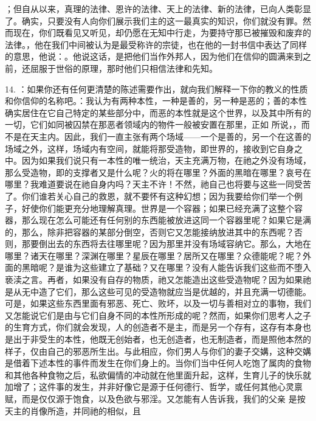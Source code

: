 ；但自从以来，真理的法律、恩许的法律、天上的法律、新的法律，已向人类彰显了。确实，只要没有人向你们展示我们主的这一最真实的知识，你们就没有罪。然而现在，你们既看见又听见，却仍愿在无知中行走，为要持守那已被摧毁和废弃的法律。，他在我们中间被认为是最受称许的宗徒，也在他的一封书信中表达了同样的意思，他说：。他说这话，是把他们当作外邦人，因为他们在信仰的圆满来到之前，还屈服于世俗的原理，那时他们只相信法律和先知。\par

14. ：如果你还有任何更清楚的陈述需要作出，就向我们解释一下你的教义的性质和你信仰的名称吧。：我认为有两种本性，一种是善的，另一种是恶的；善的本性确实居住在它自己特定的某些部分中，而恶的本性就是这个世界，以及其中所有的一切，它们如同被囚禁在那恶者领域内的物件一般被安置在那里，正如  所说，，而不是在天主内。因此，我们一直主张有两个场域——一个是善的，另一个在这善的场域之外，这样，场域内有空间，就能将那受造物，即世界的，接收到它自身之中。因为如果我们说只有一本性的唯一统治，天主充满万物，在祂之外没有场域，那么受造物，即的支撑者又是什么呢？火的将在哪里？外面的黑暗在哪里？哀号在哪里？我难道要说在祂自身内吗？天主不许！不然，祂自己也将要与这些一同受苦了。你们谁若关心自己的救恩，就不要怀有这种幻想；因为我要给你们举一个例子，好使你们能更充分地理解真理。世界是一个容器；如果已经充满了这整个容器，那么现在怎么可能还有任何别的东西能被放进这同一个容器里呢？如果它是满的，那么，除非把容器的某部分倒空，否则它又怎能接纳放进其中的东西呢？否则，那要倒出去的东西将去往哪里呢？因为那里并没有场域容纳它。那么，大地在哪里？诸天在哪里？深渊在哪里？星辰在哪里？居所又在哪里？众德能呢？呢？外面的黑暗呢？是谁为这些建立了基础？又在哪里？没有人能告诉我们这些而不堕入亵渎之言。再者，如果没有自存的物质，祂又怎能造出这些受造物呢？因为如果祂是从无中造了它们，那么这些可见的受造物就应当是优越的，并且充满一切德能。可是，如果这些东西里面有邪恶、死亡、败坏，以及一切与善相对立的事物，我们又怎能说它们是由与它们自身不同的本性所形成的呢？然而，如果你们思考人之子的生育方式，你们就会发现，人的创造者不是主，而是另一个存有，这存有本身也是出于非受生的本性，他既无创始者，也无创造者，也无制造者，而是照他本然的样子，仅由自己的邪恶所生出。与此相应，你们男人与你们的妻子交媾，这种交媾是借着下述本性的事件而发生在你们身上的。当你们当中任何人吃饱了属肉的食物和其他各种食物之后，私欲偏情的冲动就在他里面升起，这样，生育儿子的快乐就加增了；这件事的发生，并非好像它是源于任何德行、哲学，或任何其他心灵禀赋，而是仅仅源于饱食，以及色欲与邪淫。又怎能有人告诉我，我们的父亲  是按天主的肖像所造，并同祂的相似，且  